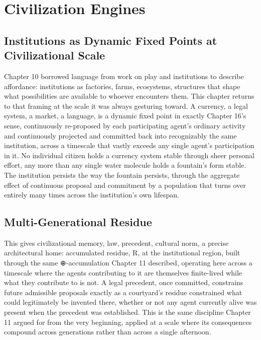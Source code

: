 \chapter{Civilization Engines}

\section{Institutions as Dynamic Fixed Points at Civilizational Scale}

Chapter 10 borrowed language from work on play and institutions to describe affordance: institutions as factories, farms, ecosystems, structures that shape what possibilities are available to whoever encounters them. This chapter returns to that framing at the scale it was always gesturing toward. A currency, a legal system, a market, a language, is a dynamic fixed point in exactly Chapter 16's sense, continuously re-proposed by each participating agent's ordinary activity and continuously projected and committed back into recognizably the same institution, across a timescale that vastly exceeds any single agent's participation in it. No individual citizen holds a currency system stable through sheer personal effort, any more than any single water molecule holds a fountain's form stable. The institution persists the way the fountain persists, through the aggregate effect of continuous proposal and commitment by a population that turns over entirely many times across the institution's own lifespan.

\section{Multi-Generational Residue}

This gives civilizational memory, law, precedent, cultural norm, a precise architectural home: accumulated residue, R, at the institutional region, built through the same ⊕-accumulation Chapter 11 described, operating here across a timescale where the agents contributing to it are themselves finite-lived while what they contribute to is not. A legal precedent, once committed, constrains future admissible proposals exactly as a courtyard's residue constrained what could legitimately be invented there, whether or not any agent currently alive was present when the precedent was established. This is the same discipline Chapter 11 argued for from the very beginning, applied at a scale where its consequences compound across generations rather than across a single afternoon.

